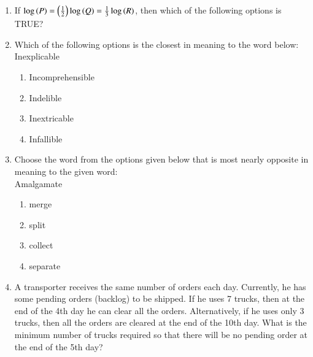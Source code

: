 \documentclass[journal,12pt,onecolumn]{IEEEtran}
\theoremstyle{remark}
\begin{document}
\begin{enumerate}
\begin{enumerate}
\end{enumerate}
\item If $\log\left(P\right) = \left(\frac{1}{2}\right)\log\left(Q\right) = \frac{1}{3}\log\left(R\right)$, then which of the following options is TRUE?
\begin{enumerate}
\end{enumerate}
\item Which of the following options is the closest in meaning to the word below:\\
Inexplicable
\begin{enumerate}
\item Incomprehensible
\item Indelible
\item Inextricable
\item Infallible
\end{enumerate}
\item Choose the word from the options given below that is most nearly opposite in meaning to the given word:\\
Amalgamate
\begin{enumerate}
\item merge
\item split
\item collect
\item separate
\end{enumerate}
\item A transporter receives the same number of orders each day. Currently, he has some pending orders (backlog) to be shipped. If he uses 7 trucks, then at the end of the 4th day he can clear all the orders. Alternatively, if he uses only 3 trucks, then all the orders are cleared at the end of the 10th day. What is the minimum number of trucks required so that there will be no pending order at the end of the 5th day?

\end{enumerate}
\end{document}
